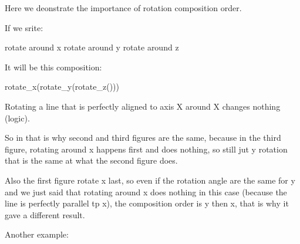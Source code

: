 \documentclass{article}
\begin{document}
Here we deonstrate the importance of rotation composition order.

If we srite:

rotate around x
rotate around y
rotate around z

It will be this composition:

rotate\_x(rotate\_y(rotate\_z()))

Rotating a line that is perfectly aligned to axis X around X changes nothing (logic).

So in that is why second and third figures are the same, because in the third figure, rotating around x happens first and does nothing, so still jut y rotation that is the same at what the second figure does.

Also the first figure rotate x last, so even if the rotation angle are the same for y and we just said that rotating around x does nothing in this case (because the line is perfectly parallel tp x), the composition order is y then x, that is why it gave a different result.






Another example:

\end{document}
